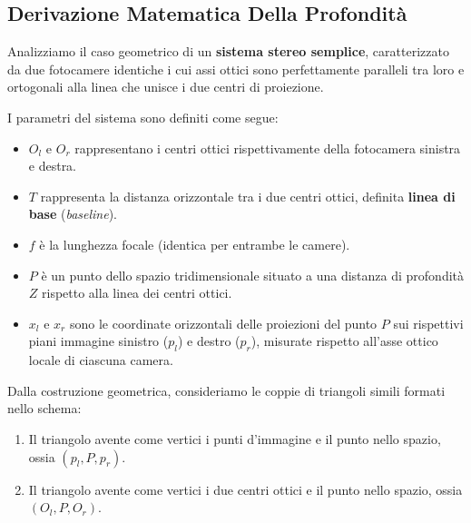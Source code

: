 ﻿\documentclass[11pt, a4paper]{article}
\begin{document}





\subsection{Derivazione Matematica Della Profondità}

Analizziamo il caso geometrico di un \textbf{sistema stereo semplice}, caratterizzato da due fotocamere identiche i cui assi ottici sono perfettamente paralleli tra loro e ortogonali alla linea che unisce i due centri di proiezione.


I parametri del sistema sono definiti come segue:
\begin{itemize}[noitemsep]
    \item $O_l$ e $O_r$ rappresentano i centri ottici rispettivamente della fotocamera sinistra e destra.
    \item $T$ rappresenta la distanza orizzontale tra i due centri ottici, definita \textbf{linea di base} (\emph{baseline}).
    \item $f$ è la lunghezza focale (identica per entrambe le camere).
    \item $P$ è un punto dello spazio tridimensionale situato a una distanza di profondità $Z$ rispetto alla linea dei centri ottici.
    \item $x_l$ e $x_r$ sono le coordinate orizzontali delle proiezioni del punto $P$ sui rispettivi piani immagine sinistro ($p_l$) e destro ($p_r$), misurate rispetto all'asse ottico locale di ciascuna camera.
\end{itemize}


Dalla costruzione geometrica, consideriamo le coppie di triangoli simili formati nello schema:
\begin{enumerate}[noitemsep]
    \item Il triangolo avente come vertici i punti d'immagine e il punto nello spazio, ossia $(p_l, P, p_r)$.
    \item Il triangolo avente come vertici i due centri ottici e il punto nello spazio, ossia $(O_l, P, O_r)$.
\end{enumerate}
\end{document}

